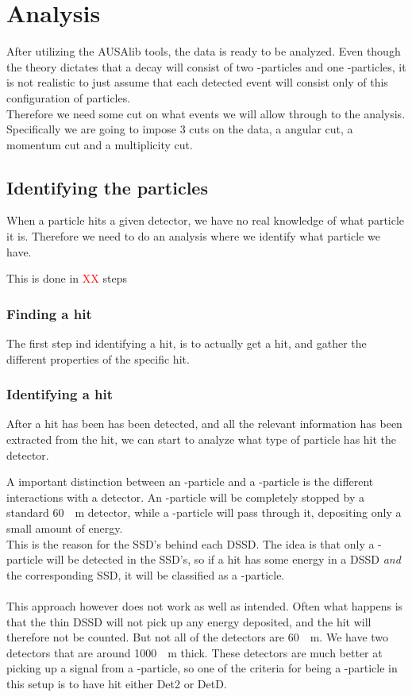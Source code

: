 \chapter{Analysis}
After utilizing the AUSAlib tools, the data is ready to be analyzed. Even though the theory dictates that a decay will consist of two \al-particles and one \be-particles, it is not realistic to just assume that each detected event will consist only of this configuration of particles. \\
Therefore we need some cut on what events we will allow through to the analysis. Specifically we are going to impose 3 cuts on the data, a angular cut, a momentum cut and a multiplicity cut.

\section{Identifying the particles}
When a particle hits a given detector, we have no real knowledge of what particle it is. 
Therefore we need to do an analysis where we identify what particle we have.

This is done in \textcolor{red}{XX} steps
\subsection{Finding a hit}
The first step ind identifying a hit, is to actually get a hit, and gather the different properties of the specific hit. 

\subsection{Identifying a hit}
After a hit has been has been detected, and all the relevant information has been extracted from the hit, we can start to analyze what type of particle has hit the detector. 

A important distinction between an \al-particle and a \be-particle is the different interactions with a detector. An \al-particle will be completely stopped by a standard \SI{60}{\mu m} detector, while a \be-particle will pass through it, depositing only a small amount of energy. \\
This is the reason for the SSD's behind each DSSD. The idea is that only a \be-particle will be detected in the SSD's, so if a hit has some energy in a DSSD \textit{and} the corresponding SSD, it will be classified as a \be-particle.\\
\\
This approach however does not work as well as intended. Often what happens is that the thin DSSD will not pick up any energy deposited, and the hit will therefore not be counted. 
But not all of the detectors are \SI{60}{\mu m}. We have two detectors that are around \SI{1000}{\mu m} thick. These detectors are much better at picking up a signal from a \be-particle, so one of the criteria for being a \be-particle in this setup is to have hit either Det2 or DetD.\\

